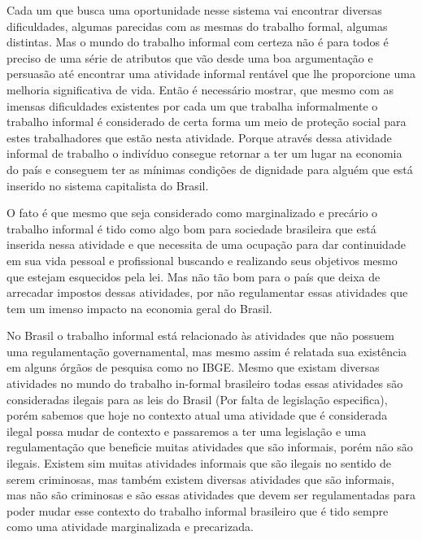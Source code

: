 Cada um que busca uma oportunidade nesse sistema vai encontrar diversas dificuldades, algumas parecidas com as mesmas do trabalho formal, algumas distintas. Mas o mundo do trabalho informal com certeza não é para todos é preciso de uma série de atributos que vão desde uma boa argumentação e persuasão até encontrar uma atividade informal rentável que lhe proporcione uma melhoria significativa de vida.
Então é necessário mostrar, que mesmo com as imensas dificuldades existentes por cada um que trabalha informalmente o trabalho informal é considerado de certa forma um meio de proteção social para estes trabalhadores que estão nesta atividade. Porque através dessa atividade informal de trabalho o indivíduo consegue retornar a ter um lugar na economia do país e conseguem ter as mínimas condições de dignidade para alguém que está inserido no sistema capitalista do Brasil.

O fato é que mesmo que seja considerado como marginalizado e precário o trabalho informal é tido como algo bom para sociedade brasileira que está inserida nessa atividade e que necessita de uma ocupação para dar continuidade em sua vida pessoal e profissional buscando e realizando seus objetivos mesmo que estejam esquecidos pela lei. Mas não tão bom para o país que deixa de arrecadar impostos dessas atividades, por não regulamentar essas atividades que tem um imenso impacto na economia geral do Brasil.

No Brasil o trabalho informal está relacionado às atividades que não possuem uma regulamentação governamental, mas mesmo assim é relatada sua existência em alguns órgãos de pesquisa como no IBGE. Mesmo que existam diversas atividades no mundo do trabalho in-formal brasileiro todas essas atividades são consideradas ilegais para as leis do Brasil (Por falta de legislação especifica), porém sabemos que hoje no contexto atual uma atividade que é considerada ilegal possa mudar de contexto e passaremos a ter uma legislação e uma regulamentação que beneficie muitas atividades que são informais, porém não são ilegais.
Existem sim muitas atividades informais que são ilegais no sentido de serem criminosas, mas também existem diversas atividades que são informais, mas não são criminosas e são essas atividades que devem ser regulamentadas para poder mudar esse contexto do trabalho informal brasileiro que é tido sempre como uma atividade marginalizada e precarizada.

